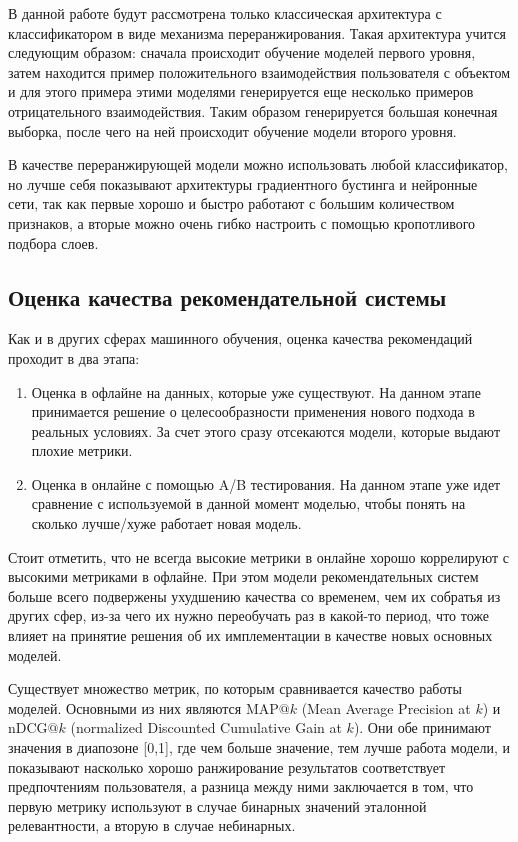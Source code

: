\documentclass[bachelor, och, coursework]{SCWorks}
\begin{document}
В данной работе будут рассмотрена только классическая архитектура с классификатором в виде механизма
переранжирования. Такая архитектура учится следующим образом: сначала происходит обучение моделей первого уровня,
затем находится пример положительного взаимодействия пользователя
с объектом и для этого примера этими моделями генерируется еще несколько примеров отрицательного
взаимодействия. Таким образом генерируется большая конечная выборка, после чего на ней происходит обучение
модели второго уровня.

В качестве переранжирующей модели можно использовать любой классификатор, но лучше себя показывают архитектуры
градиентного бустинга и нейронные сети, так как первые хорошо и быстро работают с большим количеством признаков,
а вторые можно очень гибко настроить с помощью кропотливого подбора слоев.

\subsection{Оценка качества рекомендательной системы}

Как и в других сферах машинного обучения, оценка качества рекомендаций проходит в два этапа:

\begin{enumerate}
    \item Оценка в офлайне на данных, которые уже существуют. На данном этапе принимается решение о
    целесообразности применения нового подхода в реальных условиях. За счет этого сразу отсекаются
    модели, которые выдают плохие метрики.
    \item Оценка в онлайне с помощью A/B тестирования. На данном этапе уже идет сравнение с используемой
    в данной момент моделью, чтобы понять на сколько лучше/хуже работает новая модель.
\end{enumerate}

Стоит отметить, что не всегда высокие метрики в онлайне хорошо коррелируют с высокими метриками в офлайне.
При этом модели рекомендательных систем больше всего подвержены ухудшению качества со временем, чем их собратья
из других сфер, из-за чего их нужно переобучать раз в какой-то период, что тоже влияет на принятие решения
об их имплементации в качестве новых основных моделей.

Существует множество метрик, по которым сравнивается качество работы моделей. Основными из них являются 
MAP$@k$ (Mean Average Precision at $k$) и nDCG$@k$ (normalized Discounted Cumulative Gain at $k$). Они обе принимают значения в диапозоне [0,1],
где чем больше значение, тем лучше работа модели, и показывают
насколько хорошо ранжирование результатов соответствует предпочтениям пользователя, а разница между ними заключается
в том, что первую метрику используют в случае бинарных значений эталонной релевантности, а вторую в случае
небинарных.
\end{document}
